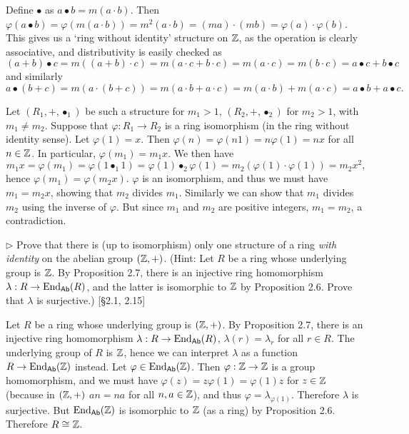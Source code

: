 \begin{solution}
	Define $\bullet$ as $a \bullet b = m(a \cdot b)$. Then $\varphi(a \bullet b) = \varphi(m(a \cdot b)) = m^2(a \cdot b) = (ma) \cdot (mb) = \varphi(a) \cdot \varphi(b)$. This gives us a `ring without identity' structure on $\mathbb{Z}$, as the operation is clearly associative, and distributivity is easily checked as
	\[
		(a + b) \bullet c = m((a + b) \cdot c) = m(a \cdot c + b \cdot c) = m(a \cdot c) = m(b \cdot c) = a \bullet c + b \bullet c
	\]
	and similarly
	\[
		a \bullet (b + c) = m(a \cdot (b + c)) = m(a \cdot b + a \cdot c) = m(a \cdot b) + m(a \cdot c) = a \bullet b + a \bullet c \text{.}
	\]
	
	Let $(R_1, +, \bullet_1)$ be such a structure for $m_1 > 1$, $(R_2, +, \bullet_2)$ for $m_2 > 1$, with $m_1 \neq m_2$. Suppose that $\varphi: R_1 \to R_2$ is a ring isomorphism (in the ring without identity sense). Let $\varphi(1) = x$. Then $\varphi(n) = \varphi(n 1) = n \varphi(1) = nx$ for all $n \in \mathbb{Z}$. In particular, $\varphi(m_1) = m_1 x$. We then have
	\[
		m_1 x = \varphi(m_1) = \varphi(1 \bullet_1 1) = \varphi(1) \bullet_2 \varphi(1) = m_2 (\varphi(1) \cdot \varphi(1)) = m_2 x^2 \text{,}
	\]
	hence $\varphi(m_1) = \varphi(m_2 x)$. $\varphi$ is an isomorphism, and thus we must have $m_1 = m_2 x$, showing that $m_2$ divides $m_1$. Similarly we can show that $m_1$ divides $m_2$ using the inverse of $\varphi$. But since $m_1$ and $m_2$ are positive integers, $m_1 = m_2$, a contradiction.
\end{solution}

\begin{problem}
	$\triangleright$ Prove that there is (up to isomorphism) only one structure of a ring \emph{with identity} on the abelian group $(\mathbb{Z}, +)$. (Hint: Let $R$ be a ring whose underlying group is $\mathbb{Z}$. By Proposition 2.7, there is an injective ring homomorphism $\lambda: R \to \mathrm{End}_{\mathsf{Ab}}(R)$, and the latter is isomorphic to $\mathbb{Z}$ by Proposition 2.6. Prove that $\lambda$ is surjective.) [\S 2.1, 2.15]
\end{problem}

\begin{solution}
	Let $R$ be a ring whose underlying group is $(\mathbb{Z}, +)$. By Proposition 2.7, there is an injective ring homomorphism $\lambda: R \to \mathrm{End}_{\mathsf{Ab}}(R)$, $\lambda(r) = \lambda_r$ for all $r \in R$. The underlying group of $R$ is $\mathbb{Z}$, hence we can interpret $\lambda$ as a function $R \to \mathrm{End}_{\mathsf{Ab}}(\mathbb{Z})$ instead. Let $\varphi \in \mathrm{End}_{\mathsf{Ab}}(\mathbb{Z})$. Then $\varphi: \mathbb{Z} \to \mathbb{Z}$ is a group homomorphism, and we must have $\varphi(z) = z\varphi(1) = \varphi(1)z$ for $z \in \mathbb{Z}$ (because in $(\mathbb{Z}, +)$ $an = na$ for all $n, a \in \mathbb{Z}$), and thus $\varphi = \lambda_{\varphi(1)}$. Therefore $\lambda$ is surjective. But $\mathrm{End}_{\mathsf{Ab}}(\mathbb{Z})$ is isomorphic to $\mathbb{Z}$ (as a ring) by Proposition 2.6. Therefore $R \cong \mathbb{Z}$.
\end{solution}

